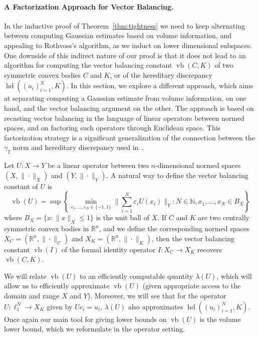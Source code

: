 \documentclass[11pt]{article}
\newcommand{\R}{{\mathbb{R}}}
\newcommand\eps{\varepsilon}
\DeclareMathOperator{\hd}{hd}
\DeclareMathOperator{\vb}{vb}
\begin{document}
\paragraph{\bf A Factorization Approach for Vector Balancing.}   

In the inductive proof of Theorem~\ref{thm:tightness} we need to keep
alternating between computing Gaussian estimates based on volume
information, and appealing to Rothvoss's algorithm, as we induct
on lower dimensional subspaces. One downside of this indirect nature
of our proof is that it does not lead to an algorithm for computing
the vector balancing constant $\vb(C,K)$ of two symmetric convex
bodies $C$ and $K$, or of the hereditary discrepancy $\hd((u_i)_{i =
  1}^N, K)$. In this section, we explore a different approach, which
aims at separating computing a Gaussian estimate from volume
information, on one hand, and the vector balancing argument on the
other. The approach is based on recasting vector balancing in the
language of linear operators between normed spaces, and on factoring
such operators through Euclidean space. This factorization strategy is
a significant generalization of the connection between the $\gamma_2$
norm and hereditary discrepancy used in~\cite{disc-gamma2}.


Let $U:X \to Y$ be a linear operator between two $n$-dimensional
normed spaces $(X, \| \cdot\|_X)$ and $(Y, \| \cdot\|_Y)$. A natural
way to define the vector balancing constant of $U$ is
\begin{equation}\label{eq:vb-oper}
\vb(U) = \sup\left\{
  \min_{\eps_1, \ldots, \eps_N \in \{-1, 1\}} 
  \biggl\|\sum_{i = 1}^N \eps_i U(x_i)\biggr\|_Y:
  N \in \mathbb{N}, x_1, \ldots, x_N \in B_X\right\}
\end{equation}
where $B_X = \{x: \|x\|_X \le 1\}$ is the unit ball of $X$. If $C$ and
$K$ are two centrally symmetric convex bodies in $\R^n$, and we define
the corresponding normed spaces $X_C = (\R^n, \|\cdot\|_C)$ and $X_K =
(\R^n, \|\cdot\|_K)$, then the vector balancing constant $\vb(I)$ of
the formal identity operator $I:X_C \to X_K$ recovers $\vb(C, K)$.

We will relate $\vb(U)$ to an efficiently computable quantity
$\lambda(U)$, which will allow us to efficiently approximate $\vb(U)$
(given appropriate access to the domain and range $X$ and
$Y$). Moreover, we will see that for the operator $U:\ell_1^N \to X_K$
given by $Ue_i = u_i$, $\lambda(U)$ also approximates $\hd((u_i)_{i =
  1}^N, K)$. Once again our main tool for giving lower bounds on
$\vb(U)$ is the volume lower bound, which we reformulate in the
operator setting.
\end{document}
